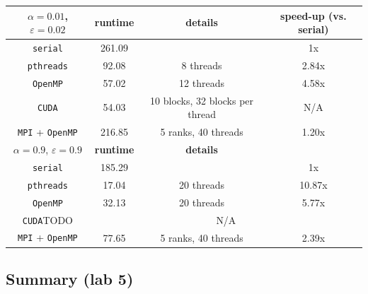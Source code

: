 \documentclass{article}
\begin{document}
\begin{center}
    \begin{tabular}{|c|c|c|c|}
        \cline{2-4}
        \multicolumn{1}{c|}{$\alpha=0.01$, $\varepsilon=0.02$}
            & \textbf{runtime} & \textbf{details} & \textbf{speed-up (vs. serial)} \\
        \cline{2-4}
        \hline
        \texttt{serial}
            & 261.09 & & 1x \\
        \texttt{pthreads}
            & 92.08 & 8 threads & 2.84x \\
        \texttt{OpenMP}
            & 57.02 & 12 threads & 4.58x \\
        \texttt{CUDA}
            & 54.03 & 10 blocks, 32 blocks per thread & N/A \\
        \texttt{MPI} + \texttt{OpenMP}
            & 216.85 & 5 ranks, 40 threads & 1.20x \\
        \hline
        \hline
        \cline{2-4}
        \multicolumn{1}{c|}{$\alpha=0.9$, $\varepsilon=0.9$}
            & \textbf{runtime} & \textbf{details} \\
        \cline{2-4}
        \hline
        \texttt{serial}
            & 185.29 & & 1x \\
        \texttt{pthreads}
            & 17.04 & 20 threads & 10.87x  \\
        \texttt{OpenMP}
            & 32.13 & 20 threads & 5.77x \\
        \cline{2-4}
        \texttt{CUDA}TODO
            & \multicolumn{3}{c|}{N/A} \\
        \cline{2-4}
        \texttt{MPI} + \texttt{OpenMP}
            & 77.65 & 5 ranks, 40 threads & 2.39x \\
        \hline
    \end{tabular}

\end{center}
    
\pagebreak
\vspace*{-6em}
\subsection*{Summary (lab 5)}
\end{document}

